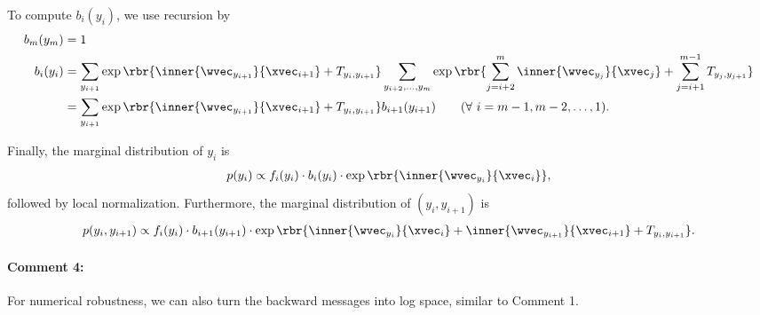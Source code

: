\documentclass[11pt]{report}
\begin{document}
To compute $b_i(y_i)$, we use recursion by
\begin{align}
\label{eq:rec_Z_forward_1}
b_m(y_m) &= 1 \\
b_i(y_i) &= \sum_{y_{i+1}} \exp \rbr{\inner{\wvec_{y_{i+1}}}{\xvec_{i+1}} + T_{y_{i}, y_{i+1}}}
\sum_{y_{i+2}, \ldots, y_m} \exp \rbr{\sum_{j=i+2}^{m} \inner{\wvec_{y_j}}{\xvec_j} + \sum_{j=i+1}^{m-1} T_{y_j, y_{j+1}}} \\
\label{eq:rec_Z_forward_2}
&= \sum_{y_{i+1}}\exp \rbr{\inner{\wvec_{y_{i+1}}}{\xvec_{i+1}} + T_{y_{i}, y_{i+1}}} b_{i+1}(y_{i+1})  \qquad (\forall\ i = m-1, m-2, \ldots, 1).	 
\end{align}

Finally, the marginal distribution of $y_i$ is
\begin{align}
	p(y_i) \propto f_i(y_i) \cdot b_i(y_i) \cdot \exp \rbr{\inner{\wvec_{y_{i}}}{\xvec_{i}}},
\end{align}
followed by local normalization.
Furthermore, the marginal distribution of $(y_i, y_{i+1})$ is
\begin{align}
  p(y_i, y_{i+1}) \propto f_i(y_i) \cdot b_{i+1}(y_{i+1}) \cdot 
  \exp \rbr{\inner{\wvec_{y_{i}}}{\xvec_{i}} + \inner{\wvec_{y_{i+1}}}{\xvec_{i+1}} + T_{y_i, y_{i+1}}}.
\end{align}

\paragraph{Comment 4:}
For numerical robustness,
we can also turn the backward messages into log space, similar to Comment 1.
\end{document}
